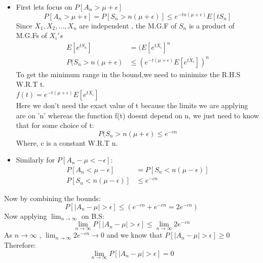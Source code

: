 \documentclass[12pt]{article}
\begin{document}
\begin{itemize}
    \item First lets focus on $P[A_n > \mu + \epsilon]$
\begin{equation}
    P[A_n > \mu+\epsilon]=P[S_n > n(\mu+\epsilon)] \leq e^{-tn(\mu+\epsilon)}E[tS_n]
\end{equation}
Since $X_1,X_2,\dots,X_n$ are independent , the M.G.F of $S_n$ is a product of M.G.Fs of $X_i's$
\begin{equation}
\begin{split}
    E[e^{tS_n}] &= (E[e^{tX_i}]^n\\
    P(S_n > n(\mu+\epsilon) &\leq ( e^{-t(\mu+\epsilon)}E[e^{tX_i}])^n
\end{split}
\end{equation}
To get the minimum range in the bound,we need to minimize the R.H.S W.R.T t.\\

$f(t) = e^{-t(\mu+\epsilon)}E[e^{tX_i}]$\\

Here we don't need the exact value of t because the limits we are applying are on 'n' whereas the function f(t) doesnt depend on n, we just need to know that for some choice of t:
\begin{equation}
     P(S_n > n(\mu+\epsilon) \leq e^{-cn}
\end{equation}
Where, c is a constant W.R.T n.\\
\item Similarly for $P[A_n - \mu < -\epsilon]$:
\begin{equation}
\begin{split}
     P[A_n  < \mu -\epsilon] &= P[S_n < n( \mu -\epsilon)]\\
     P[S_n < n( \mu -\epsilon)] &\leq e^{-cn} 
\end{split}
\end{equation}
\end{itemize}
Now by combining the bounds:
\begin{equation}
    P[|A_n - \mu| > \epsilon] \leq (e^{-cn} + e^{-cn} = 2e^{-cn}) 
\end{equation}
Now applying $\lim_{n\to\infty}$ on B.S:
\begin{equation}
    \lim_{n\to\infty}P[|A_n - \mu| > \epsilon] \leq \lim_{n\to\infty}2e^{-cn}
\end{equation}
As $n \to \infty$ , $\lim_{n\to\infty}2e^{-cn} \to 0$ and we know that
$P[|A_n - \mu| > \epsilon] \geq 0$\\
Therefore:
\begin{equation}
     \lim_{n\to\infty}P[|A_n - \mu| > \epsilon] = 0
\end{equation}
\end{document}
